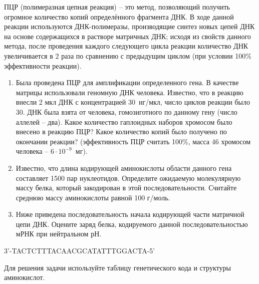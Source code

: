 
ПЦР (полимеразная цепная реакция) – это метод, позволяющий получить огромное количество копий определённого фрагмента ДНК. В ходе данной реакции используются ДНК-полимеразы, производящие синтез новых цепей ДНК на основе содержащихся в растворе матричных ДНК; исходя из свойств данного метода, после проведения каждого следующего цикла реакции количество ДНК увеличивается в 2 раза по сравнению с предыдущим циклом (при условии 100\% эффективности реакции).

\begin{enumerate}
    \item Была проведена ПЦР для амплификации определенного гена. В качестве матрицы использовали геномную ДНК человека. 
    Известно, что в реакцию внесли 2 мкл ДНК с концентрацией 30~нг/мкл, число циклов реакции было 30. 
    ДНК была взята от человека, гомозиготного по данному гену (число аллелей – два). Какое количество 
    гаплоидных наборов хромосом было внесено в реакцию ПЦР? Какое количество копий было получено по 
        окончании реакции? (эффективность ПЦР считать 100\%, масса 46 хромосом человека – $6 \cdot 10^{-9}$~мг).
    \item Известно, что длина кодирующей аминокислоты области данного гена составляет 1500 пар нуклеотидов. Определите ожидаемую молекулярную массу белка, который закодирован в этой последовательности. Считайте среднюю массу аминокислоты равной 100 г/моль.
    \item Ниже приведена последовательность начала кодирующей части матричной цепи ДНК. Оцените заряд белка, кодируемого данной последовательностью мРНК при нейтральном рН.
\end{enumerate}
 
\begin{center}
    3’-TACTCTTTACAACGCATATTTGGACTA-5’    
\end{center}


Для решения задачи используйте таблицу генетического кода и структуры аминокислот.


